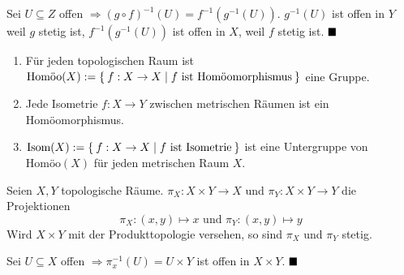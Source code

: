 
\begin{beweis}
    Sei $U \subseteq Z$ offen $\Rightarrow (g \circ f)^{-1} (U) = f^{-1} (g^{-1}(U))$.
    $g^{-1}(U)$ ist offen in $Y$ weil $g$ stetig ist, $f^{-1}(g^{-1}(U))$
    ist offen in $X$, weil $f$ stetig ist. $\qed$
\end{beweis}

\begin{bemerkung}
    \begin{enumerate}[label=\alph*)]
        \item Für jeden topologischen Raum ist 
              $\text{Homöo}(X) := \Set{f: X \rightarrow X | f \text{ ist Homöomorphismus}}$
              eine Gruppe.
        \item Jede Isometrie $f:X \rightarrow Y$ zwischen metrischen 
              Räumen ist ein Homöomorphismus.
        \item $\text{Isom}(X) := \Set{f:X \rightarrow X | f \text{ ist Isometrie}}$ ist
              eine Untergruppe von $\text{Homöo}(X)$ für jeden
              metrischen Raum $X$.
    \end{enumerate}
\end{bemerkung}

\begin{korollar}
    Seien $X, Y$ topologische Räume. $\pi_X: X \times Y \rightarrow X$
    und $\pi_Y: X \times Y \rightarrow Y$ die Projektionen 
    \[\pi_X: (x,y) \mapsto x \text{ und } \pi_Y: (x,y) \mapsto y\]
    Wird $X \times Y$ mit der Produkttopologie versehen, so sind $\pi_X$
    und $\pi_Y$ stetig.
\end{korollar}

\begin{beweis}
    Sei $U \subseteq X$ offen $\Rightarrow \pi_x^{-1} (U) = U \times Y$ 
    ist offen in $X \times Y$. $\qed$
\end{beweis}

